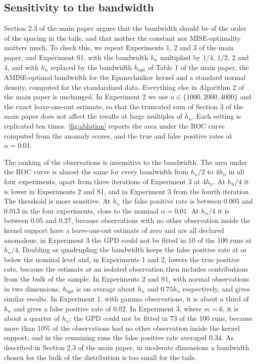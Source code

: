 \subsection{Sensitivity to the bandwidth}\label{sec:ablationsupp}

Section 2.3 of the main paper argues that the bandwidth should be of the order of the spacing in the tails, and that neither the constant nor MISE-optimality matters much. To check this, we repeat Experiments 1, 2 and 3 of the main paper, and Experiment S1, with the bandwidth $h_n$ multiplied by $1/4$, $1/2$, $2$ and $4$, and with $h_n$ replaced by the bandwidth $h_{\text{opt}}$ of Table 1 of the main paper, the AMISE-optimal bandwidth for the Epanechnikov kernel and a standard normal density, computed for the standardized data. Everything else in Algorithm 2 of the main paper is unchanged. In Experiment 2 we use $n\in\{1000, 2000, 4000\}$ and the exact leave-one-out estimate, so that the truncated sum of Section 3 of the main paper does not affect the results at large multiples of $h_n$. Each setting is replicated ten times. \cref{fig:ablation} reports the area under the ROC curve computed from the anomaly scores, and the true and false positive rates at $\alpha=0.01$.

The ranking of the observations is insensitive to the bandwidth. The area under the ROC curve is almost the same for every bandwidth from $h_n/2$ to $4h_n$ in all four experiments, apart from three iterations of Experiment 3 at $4h_n$. At $h_n/4$ it is lower in Experiments 2 and S1, and in Experiment 3 from the fourth iteration. The threshold is more sensitive. At $h_n$ the false positive rate is between $0.005$ and $0.013$ in the four experiments, close to the nominal $\alpha=0.01$. At $h_n/4$ it is between $0.05$ and $0.27$, because observations with no other observation inside the kernel support have a leave-one-out estimate of zero and are all declared anomalous; in Experiment 3 the GPD could not be fitted in 10 of the 100 runs at $h_n/4$. Doubling or quadrupling the bandwidth keeps the false positive rate at or below the nominal level and, in Experiments 1 and 2, lowers the true positive rate, because the estimate at an isolated observation then includes contributions from the bulk of the sample. In Experiments 2 and S1, with normal observations in two dimensions, $h_{\text{opt}}$ is on average about $h_n$ and $0.75h_n$ respectively, and gives similar results. In Experiment 1, with gamma observations, it is about a third of $h_n$ and gives a false positive rate of $0.02$. In Experiment 3, where $m=6$, it is about a quarter of $h_n$; the GPD could not be fitted in 73 of the 100 runs, because more than $10\%$ of the observations had no other observation inside the kernel support, and in the remaining runs the false positive rate averaged $0.34$. As described in Section 2.3 of the main paper, in moderate dimensions a bandwidth chosen for the bulk of the distribution is too small for the tails.

